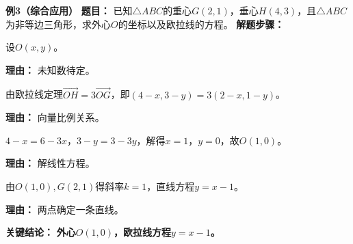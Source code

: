 \begin{examplebox}
	\medskip
	\textbf{\textcolor{CExample}{例3（综合应用）}}
	\textbf{\textcolor{CExample}{题目：}}
	已知$\triangle ABC$的重心$G(2,1)$，垂心$H(4,3)$，且$\triangle ABC$为非等边三角形，求外心$O$的坐标以及欧拉线的方程。
	\textbf{\textcolor{CExample}{解题步骤：}}
	\begin{description}[style=nextline, leftmargin=2.8em, labelsep=0.5em, itemsep=0.45em]
		\item[\textbf{第一步（设外心坐标）：}]
			设$O(x,y)$。
			\par\textbf{理由：} 未知数待定。
		\item[\textbf{第二步（列向量方程）：}]
			由欧拉线定理$\overrightarrow{OH}=3\overrightarrow{OG}$，即$(4-x,3-y)=3(2-x,1-y)$。
			\par\textbf{理由：} 向量比例关系。
		\item[\textbf{第三步（解方程组）：}]
			$4-x=6-3x$，$3-y=3-3y$，解得$x=1$，$y=0$，故$O(1,0)$。
			\par\textbf{理由：} 解线性方程。
		\item[\textbf{第四步（求欧拉线方程）：}]
			由$O(1,0),G(2,1)$得斜率$k=1$，直线方程$y=x-1$。
			\par\textbf{理由：} 两点确定一条直线。
	\end{description}
	\textbf{\textcolor{CExample}{关键结论：}}
	\textbf{外心$O(1,0)$，欧拉线方程$y=x-1$。}
\end{examplebox}
